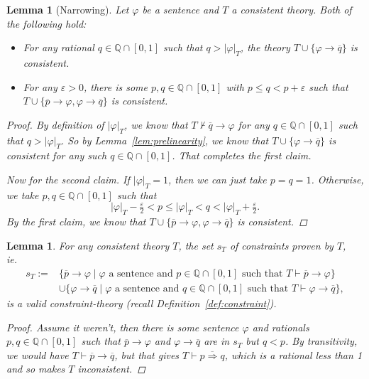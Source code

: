 \documentclass{amsart}
\newtheorem{lemma}[theorem]{Lemma}
\theoremstyle{definition}
\numberwithin{equation}{theorem}
\renewcommand{\phi}{\varphi}
\renewcommand{\epsilon}{\varepsilon}
\newcommand{\Q}{\mathbb{Q}}
\newcommand{\where}{\mid}
\newcommand{\proves}{\vdash}
\newcommand{\rat}[1]{{\overline{#1}}}
\newcommand{\narrow}[1]{\xrightarrow{#1}}
\renewcommand{\to}{\narrow{}}
\begin{document}
\begin{lemma}[Narrowing]\label{lem:narrowing}
  Let $\phi$ be a sentence and $T$ a consistent theory.
  Both of the following hold:
  \begin{itemize}
  \item For any rational $q\in\Q\cap[0,1]$ such that $q>|\phi|_T$, the theory $T\cup\{\phi\to\rat q\}$ is consistent.
  \item For any $\epsilon>0$, there is some $p,q\in\Q\cap[0,1]$ with $p\leq q<p+\epsilon$ such that $T\cup\{\rat p\to\phi, \phi\to\rat q\}$ is consistent.
  \end{itemize}
  \begin{proof}
    By definition of $|\phi|_T$, we know that $T\not\proves\rat q\to\phi$ for any $q\in\Q\cap[0,1]$ such that $q>|\phi|_T$.
    So by Lemma~\ref{lem:prelinearity}, we know that $T\cup\{\phi\to\rat q\}$ is consistent for any such $q\in\Q\cap[0,1]$.
    That completes the first claim.
    
    Now for the second claim.
    If $|\phi|_T=1$, then we can just take $p=q=1$.
    Otherwise, we take $p,q\in\Q\cap[0,1]$ such that
    \[
      |\phi|_T-\tfrac\epsilon2<p\leq|\phi|_T<q<|\phi|_T+\tfrac\epsilon2.
    \]
    By the first claim, we know that $T\cup\{\rat p\to\phi,\phi\to\rat q\}$ is consistent.
  \end{proof}
\end{lemma}
\begin{lemma}\label{lem:valid-constraint}
  For any consistent theory $T$, the set $s_T$ of constraints proven by $T$, ie.\ 
  \begin{align*}
    s_T:=&\{\rat p\to\phi\where\text{$\phi$ a sentence and $p\in\Q\cap[0,1]$ such that $T\proves\rat p\to\phi$}\}\\
    &\cup\{\phi\to\rat q\where\text{$\phi$ a sentence and $q\in\Q\cap[0,1]$ such that $T\proves\phi\to\rat q$}\},
  \end{align*}
  is a valid constraint-theory (recall Definition~\ref{def:constraint}).
  \begin{proof}
    Assume it weren't, then there is some sentence $\phi$ and rationals $p,q\in\Q\cap[0,1]$ such that $\rat p\to\phi$ and $\phi\to\rat q$ are in $s_T$ but $q<p$.
    By transitivity, we would have $T\proves\rat p\to\rat q$, but that gives $T\proves\rat{p\Rightarrow q}$, which is a rational less than 1 and so makes $T$ inconsistent.
  \end{proof}
\end{lemma}
\end{document}
